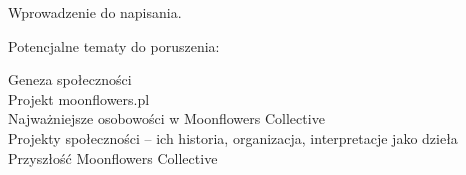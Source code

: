 Wprowadzenie do napisania.

\vin Potencjalne tematy do poruszenia: 

Geneza społeczności \\
Projekt moonflowers.pl \\
Najważniejsze osobowości w Moonflowers Collective \\
Projekty społeczności -- ich historia, organizacja, interpretacje jako dzieła \\
Przyszłość Moonflowers Collective
